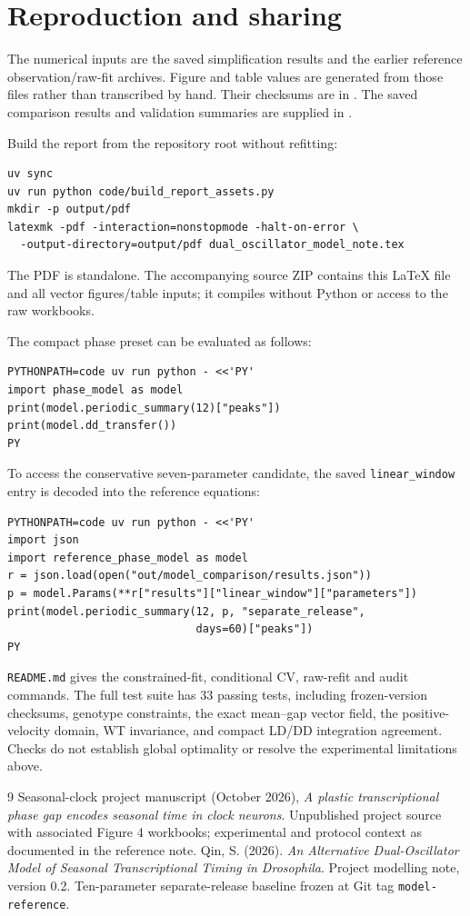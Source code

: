 \documentclass[11pt,letterpaper]{article}
\begin{document}
\clearpage
\section{Reproduction and sharing}

The numerical inputs are the saved simplification results and the earlier
reference observation/raw-fit archives. Figure and table values are generated
from those files rather than transcribed by hand.
Their checksums are in .
The saved comparison results and validation summaries are supplied in
.

Build the report from the repository root without refitting:
\begin{lstlisting}
uv sync
uv run python code/build_report_assets.py
mkdir -p output/pdf
latexmk -pdf -interaction=nonstopmode -halt-on-error \
  -output-directory=output/pdf dual_oscillator_model_note.tex
\end{lstlisting}
The PDF is standalone. The accompanying source ZIP contains this
LaTeX file and all vector figures/table inputs; it compiles without
Python or access to the raw workbooks.

The compact phase preset can be evaluated as follows:
\begin{lstlisting}
PYTHONPATH=code uv run python - <<'PY'
import phase_model as model
print(model.periodic_summary(12)["peaks"])
print(model.dd_transfer())
PY
\end{lstlisting}
To access the conservative seven-parameter candidate, the saved
\texttt{linear\_window} entry is decoded into the reference equations:
\begin{lstlisting}
PYTHONPATH=code uv run python - <<'PY'
import json
import reference_phase_model as model
r = json.load(open("out/model_comparison/results.json"))
p = model.Params(**r["results"]["linear_window"]["parameters"])
print(model.periodic_summary(12, p, "separate_release",
                             days=60)["peaks"])
PY
\end{lstlisting}

\texttt{README.md} gives the constrained-fit, conditional CV,
raw-refit and audit commands. The full test suite has 33 passing tests,
including frozen-version checksums, genotype constraints, the exact
mean--gap vector field, the positive-velocity domain, WT invariance,
and compact LD/DD integration agreement. Checks do not establish
global optimality or resolve the experimental limitations above.

\begin{thebibliography}{9}
Seasonal-clock project manuscript (October 2026),
\emph{A plastic transcriptional phase gap encodes seasonal time in
clock neurons}. Unpublished project source with associated Figure 4
workbooks; experimental and protocol context as documented in the reference note.
\bibitem{v02}
Qin, S. (2026).
\emph{An Alternative Dual-Oscillator Model of Seasonal Transcriptional
Timing in Drosophila}. Project modelling note, version 0.2.
Ten-parameter separate-release baseline frozen at Git tag
\texttt{model-reference}.
\end{thebibliography}
\end{document}
